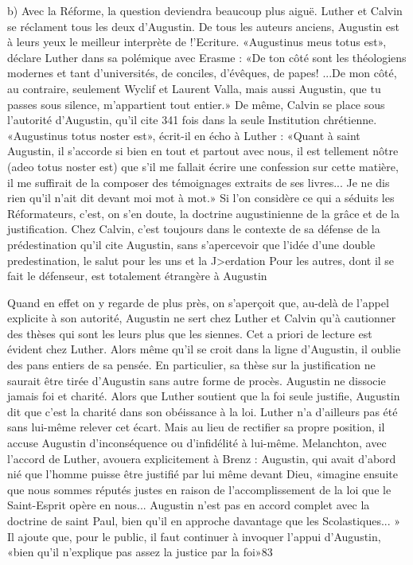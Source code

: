 b)	Avec  la  Réforme,  la  question  deviendra  beaucoup  plus  aiguë. Luther et Calvin se réclament tous les deux d'Augustin. De tous les auteurs anciens, Augustin est à leurs yeux le meilleur interprète de !'Ecriture. «Augustinus  meus totus est», déclare Luther dans sa polémique avec Erasme : «De ton côté sont les théologiens modernes et tant d'universités, de conciles, d'évêques, de papes! ...De mon côté, au contraire, seulement Wyclif et Laurent Valla, mais aussi Augustin, que tu passes sous silence, m'appartient tout entier.» De même, Calvin se place sous l'autorité  d'Augustin,  qu'il  cite  341  fois  dans  la  seule  Institution  chrétienne.
«Augustinus totus noster est», écrit-il en écho à Luther : «Quant à saint Augustin, il s'accorde si bien en tout et partout avec nous, il est tellement nôtre (adeo totus noster est) que s'il me fallait écrire une confession sur cette matière, il me suffirait de la composer des témoignages extraits de ses livres... Je ne dis rien qu'il n'ait dit devant moi mot à mot.» Si l'on considère ce qui a séduits les Réformateurs, c'est, on s'en doute, la doctrine augustinienne de la grâce et de la justification. Chez Calvin, c'est toujours dans le contexte de sa défense de la prédestination qu'il cite Augustin, sans
s'apercevoir que l'idée d'une double predestination, le salut pour les uns et la J>erdation Pour les autres, dont il se fait le défenseur, est totalement étrangère à Augustin

Quand en effet on y regarde de plus près, on s'aperçoit que, au-delà de l'appel explicite à son autorité, Augustin ne sert chez Luther et Calvin qu'à cautionner des thèses qui sont les leurs plus que les siennes. Cet a priori de lecture est évident chez Luther. Alors même qu'il se croit dans la ligne d'Augustin, il oublie des pans entiers de sa pensée. En particulier, sa thèse sur la justification ne saurait être tirée d'Augustin sans autre forme de procès. Augustin ne dissocie jamais foi et charité. Alors que Luther soutient que la foi seule justifie, Augustin dit que c'est la charité dans son obéissance à la loi. Luther n'a d'ailleurs pas été sans lui-même relever cet écart. Mais au lieu de rectifier sa propre position, il accuse Augustin d'inconséquence ou d'infidélité à lui-même. Melanchton, avec l'accord de Luther, avouera explicitement à Brenz : Augustin, qui avait d'abord nié que l'homme puisse être justifié par lui­ même devant Dieu, «imagine ensuite que nous sommes réputés justes en raison de l'accomplissement de la loi que le Saint-Esprit opère en nous... Augustin n'est pas en accord complet avec la doctrine de saint Paul, bien qu'il en approche davantage que les Scolastiques... » Il ajoute que, pour le public, il faut continuer à invoquer l'appui d'Augustin, «bien qu'il n'explique pas assez la justice par la foi»83 

